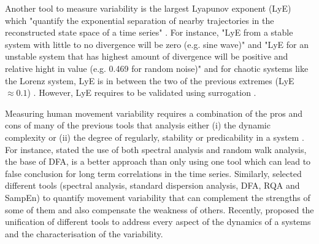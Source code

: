 %
%
%
%


Another tool to measure variability is the largest Lyapunov exponent (LyE) 
which "quantify the exponential separation of nearby trajectories
in the reconstructed state space of a time series" \citep[p. ??]{stergiou2004}.
For instance, "LyE from a stable system with little to no divergence will 
be zero (e.g. sine wave)" and "LyE for an unstable system that has highest 
amount of divergence will be positive and relative hight in value
(e.g. 0.469 for random noise)" and for chaotic systems like the Lorenz system,
LyE is in between the two of the previous extremes (LyE$\approx0.1$) 
\cite[p. 2874]{miller2006}. However,  LyE requires to be validated using 
surrogation \citep{dingwell2000, miller2006}.



Measuring human movement variability requires a combination of the 
pros and cons of many of the previous tools that analysis either 
(i) the dynamic complexity or (ii) the degree of regularly, stability or 
predicability in a system \citep{goldberger2002b, harbourne2009, stergiou2011}.
For instance, \cite{rangarajan2000} stated the use of both spectral analysis 
and random walk analysis, the base of DFA, is a better approach than only 
using one tool which can lead to false conclusion for long term correlations
in the time series.
Similarly, \cite{wijnants2009} selected different tools (spectral analysis, 
standard dispersion analysis, DFA, RQA and SampEn) to quantify movement 
variability that can complement the strengths of some of them and also 
compensate the weakness of others. Recently, \cite{caballero2014} proposed 
the unification of different tools to address every aspect of the dynamics 
of a systems and the characterisation of the variability. 

